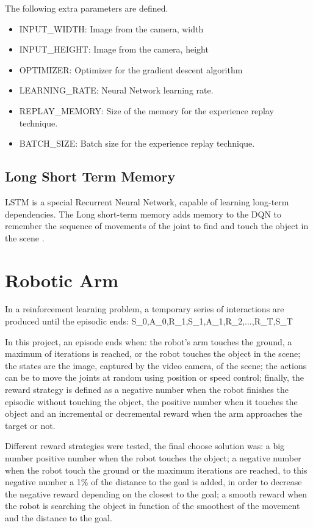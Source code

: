 \documentclass[10pt,journal,compsoc]{IEEEtran}
\begin{document}
The following extra parameters are defined.

\begin{itemize}
\item  INPUT\_WIDTH: Image from the camera, width
\item  INPUT\_HEIGHT: Image from the camera, height
\item  OPTIMIZER: Optimizer for the gradient descent algorithm 
\item  LEARNING\_RATE: Neural Network learning rate.
\item  REPLAY\_MEMORY: Size of the memory for the experience replay technique.
\item  BATCH\_SIZE: Batch size for the experience replay technique.
\end{itemize}

\subsection{Long Short Term Memory}

LSTM is a special Recurrent Neural Network, capable of learning long-term dependencies. The Long short-term memory adds memory to the DQN to remember the sequence of movements of the joint to find and touch the object in the scene \cite{lstmnetwork}.

\section{Robotic Arm}

In a reinforcement learning problem, a temporary series of interactions are produced until the episodic ends: S_{0},A_{0},R_{1},S_{1},A_{1},R_{2},...,R_{T},S_{T}

In this project, an episode ends when: the robot's arm touches the ground, a maximum of iterations is reached, or the robot touches the object in the scene; the states are the image, captured by the video camera, of the scene; the actions can be to move the joints at random using position or speed control; finally, the reward strategy is defined as a negative number when the robot finishes the episodic without touching the object, the positive number when it touches the object and an incremental or decremental reward when the arm approaches the target or not.

Different reward strategies were tested, the final choose solution was: a big number positive number when the robot touches the object; a negative number when the robot touch the ground or the maximum iterations are reached, to this negative number a 1\% of the distance to the goal is added, in order to decrease the negative reward depending on the closest to the goal; a smooth reward when the robot is searching the object in function of the smoothest of the movement and the distance to the goal.
\end{document}
